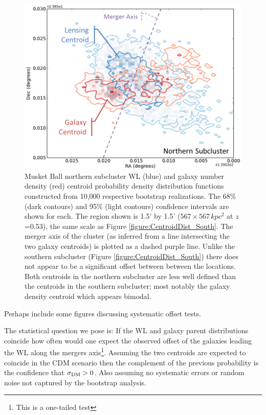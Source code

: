 \begin{figure}
\centering
\includegraphics[width=5in]{Chapter4/AnalysisFiles/northcentroids_histplot2d_reformat.png}
\caption[Musket Ball northern subcluster galaxy and weak lensing centroid spatial distribution.]{
Musket Ball northern subcluster WL (blue) and galaxy number density (red) centroid probability density distribution functions constructed from 10,000 respective bootstrap realizations.
The 68\% (dark contours) and 95\% (light contours) confidence intervals are shown for each.
The region shown is 1.5' by 1.5' ($567\times 567\,kpc^2$ at $z$=0.53), the same scale as Figure \ref{figure:CentroidDist_South}.
The merger axis of the cluster (as inferred from a line intersecting the two galaxy centroids) is plotted as a dashed purple line.
Unlike the southern subcluster (Figure \ref{figure:CentroidDist_South}) there does not appear to be a significant offset between between the locations.
Both centroids in the northern subcluster are less well defined than the centroids in the southern subcluster; most notably the galaxy density centroid which appears bimodal.
}
\label{figure:CentroidDist_North}
\end{figure}

Perhaps include some figures discussing systematic offset tests.

The statistical question we pose is:
If the WL and galaxy parent distributions coincide how often would one expect the observed offset of the galaxies leading the WL along the mergers axis\footnote{This is a one-tailed test}.
Assuming the two centroids are expected to coincide in the CDM scenario then the complement of the previous probability is the confidence that $\sigma_{\rm DM}>0$.
Also assuming no systematic errors or random noise not captured by the bootstrap analysis.


